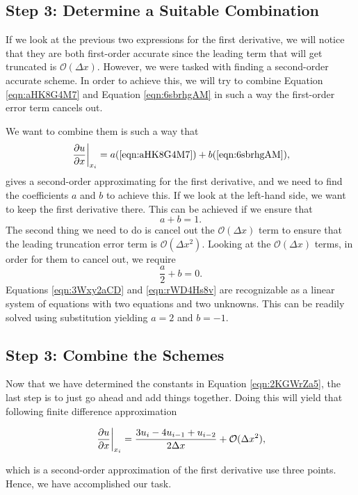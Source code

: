 \subsection{Step 3: Determine a Suitable Combination}
If we look at the previous two expressions for the first derivative, we will notice that they are both first-order accurate since the leading term that will get truncated is $\mathcal{O}(\Delta x)$. However, we were tasked with finding a second-order accurate scheme. In order to achieve this, we will try to combine Equation \ref{eqn:aHK8G4M7} and Equation \ref{eqn:6sbrhgAM} in such a way the first-order error term cancels out.

We want to combine them is such a way that
\begin{equation}
	\left.\frac{\partial u}{\partial x}\right\rvert_{x_i}^{} = a(\ref{eqn:aHK8G4M7}) + b(\ref{eqn:6sbrhgAM}),
	\label{eqn:2KGWrZa5}
\end{equation}
gives a second-order approximating for the first derivative, and we need to find the coefficients $a$ and $b$ to achieve this. If we look at the left-hand side, we want to keep the first derivative there. This can be achieved if we ensure that
\begin{equation}
	a + b = 1.
	\label{eqn:3Wxy2aCD}
\end{equation}
The second thing we need to do is cancel out the $\mathcal{O}(\Delta x)$ term to ensure that the leading truncation error term is $\mathcal{O}(\Delta x^2)$. Looking at the $\mathcal{O}(\Delta x)$ terms, in order for them to cancel out, we require
\begin{equation}
	\frac{a}{2} + b = 0.
	\label{eqn:rWD4Hs8v}
\end{equation}
Equations \ref{eqn:3Wxy2aCD} and \ref{eqn:rWD4Hs8v} are recognizable as a linear system of equations with two equations and two unknowns. This can be readily solved using substitution yielding $a=2$ and $b=-1$.

\subsection{Step 3: Combine the Schemes}
Now that we have determined the constants in Equation \ref{eqn:2KGWrZa5}, the last step is to just go ahead and add things together. Doing this will yield that following finite difference approximation
\begin{eqBox}
\begin{equation}
	\left.\frac{\partial u}{\partial x}\right\rvert_{x_i}^{} = \frac{3u_i - 4u_{i-1} + u_{i-2}}{2 \Delta x} + \mathcal{O}(\Delta x^2),
	\label{eqn:aHK8G4M7}
\end{equation}
\end{eqBox}
which is a second-order approximation of the first derivative use three points. Hence, we have accomplished our task.

